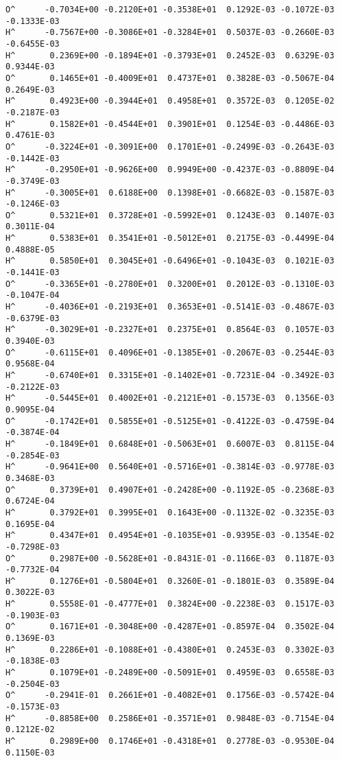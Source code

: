 \begin{verbatim}
O^      -0.7034E+00 -0.2120E+01 -0.3538E+01  0.1292E-03 -0.1072E-03 -0.1333E-03
H^      -0.7567E+00 -0.3086E+01 -0.3284E+01  0.5037E-03 -0.2660E-03 -0.6455E-03
H^       0.2369E+00 -0.1894E+01 -0.3793E+01  0.2452E-03  0.6329E-03  0.9344E-03
O^       0.1465E+01 -0.4009E+01  0.4737E+01  0.3828E-03 -0.5067E-04  0.2649E-03
H^       0.4923E+00 -0.3944E+01  0.4958E+01  0.3572E-03  0.1205E-02 -0.2187E-03
H^       0.1582E+01 -0.4544E+01  0.3901E+01  0.1254E-03 -0.4486E-03  0.4761E-03
O^      -0.3224E+01 -0.3091E+00  0.1701E+01 -0.2499E-03 -0.2643E-03 -0.1442E-03
H^      -0.2950E+01 -0.9626E+00  0.9949E+00 -0.4237E-03 -0.8809E-04 -0.3749E-03
H^      -0.3005E+01  0.6188E+00  0.1398E+01 -0.6682E-03 -0.1587E-03 -0.1246E-03
O^       0.5321E+01  0.3728E+01 -0.5992E+01  0.1243E-03  0.1407E-03  0.3011E-04
H^       0.5383E+01  0.3541E+01 -0.5012E+01  0.2175E-03 -0.4499E-04  0.4888E-05
H^       0.5850E+01  0.3045E+01 -0.6496E+01 -0.1043E-03  0.1021E-03 -0.1441E-03
O^      -0.3365E+01 -0.2780E+01  0.3200E+01  0.2012E-03 -0.1310E-03 -0.1047E-04
H^      -0.4036E+01 -0.2193E+01  0.3653E+01 -0.5141E-03 -0.4867E-03 -0.6379E-03
H^      -0.3029E+01 -0.2327E+01  0.2375E+01  0.8564E-03  0.1057E-03  0.3940E-03
O^      -0.6115E+01  0.4096E+01 -0.1385E+01 -0.2067E-03 -0.2544E-03  0.9568E-04
H^      -0.6740E+01  0.3315E+01 -0.1402E+01 -0.7231E-04 -0.3492E-03 -0.2122E-03
H^      -0.5445E+01  0.4002E+01 -0.2121E+01 -0.1573E-03  0.1356E-03  0.9095E-04
O^      -0.1742E+01  0.5855E+01 -0.5125E+01 -0.4122E-03 -0.4759E-04 -0.3874E-04
H^      -0.1849E+01  0.6848E+01 -0.5063E+01  0.6007E-03  0.8115E-04 -0.2854E-03
H^      -0.9641E+00  0.5640E+01 -0.5716E+01 -0.3814E-03 -0.9778E-03  0.3468E-03
O^       0.3739E+01  0.4907E+01 -0.2428E+00 -0.1192E-05 -0.2368E-03  0.6724E-04
H^       0.3792E+01  0.3995E+01  0.1643E+00 -0.1132E-02 -0.3235E-03  0.1695E-04
H^       0.4347E+01  0.4954E+01 -0.1035E+01 -0.9395E-03 -0.1354E-02 -0.7298E-03
O^       0.2987E+00 -0.5628E+01 -0.8431E-01 -0.1166E-03  0.1187E-03 -0.7732E-04
H^       0.1276E+01 -0.5804E+01  0.3260E-01 -0.1801E-03  0.3589E-04  0.3022E-03
H^       0.5558E-01 -0.4777E+01  0.3824E+00 -0.2238E-03  0.1517E-03 -0.1903E-03
O^       0.1671E+01 -0.3048E+00 -0.4287E+01 -0.8597E-04  0.3502E-04  0.1369E-03
H^       0.2286E+01 -0.1088E+01 -0.4380E+01  0.2453E-03  0.3302E-03 -0.1838E-03
H^       0.1079E+01 -0.2489E+00 -0.5091E+01  0.4959E-03  0.6558E-03 -0.2504E-03
O^      -0.2941E-01  0.2661E+01 -0.4082E+01  0.1756E-03 -0.5742E-04 -0.1573E-03
H^      -0.8858E+00  0.2586E+01 -0.3571E+01  0.9848E-03 -0.7154E-04  0.1212E-02
H^       0.2989E+00  0.1746E+01 -0.4318E+01  0.2778E-03 -0.9530E-04  0.1150E-03

\end{verbatim}
